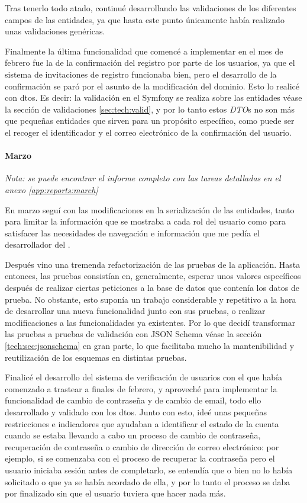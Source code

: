 Tras tenerlo todo atado, continué desarrollando las validaciones de los diferentes campos
de las entidades, ya que hasta este punto únicamente había realizado unas validaciones
genéricas.

Finalmente la última funcionalidad que comencé a implementar en el mes de febrero fue la de la
confirmación del registro por parte de los usuarios, ya que el sistema de invitaciones
de registro funcionaba bien, pero el desarrollo de la confirmación se paró por el asunto
de la modificación del dominio. Esto lo realicé con \gls{dto}s.
Es decir: la validación en el  Symfony se realiza
sobre las entidades \textemdash véase la sección de validaciones \ref{sec:tech:valid}\textemdash,
y por lo tanto estos \textit{DTO}s no son más que pequeñas entidades que sirven para un
propósito específico, como puede ser el recoger el identificador y el correo electrónico
de la confirmación del usuario.

\paragraph{Marzo}
\textit{Nota: se puede encontrar el informe completo con las tareas detalladas
en el anexo \ref{app:reports:march}}

En marzo seguí con las modificaciones en la serialización de las entidades, tanto para
limitar la información que se mostraba a cada rol del usuario como para satisfacer las
necesidades de navegación e información que me pedía el desarrollador del .

Después vino una tremenda refactorización de las pruebas de la aplicación. Hasta entonces,
las pruebas consistían en, generalmente, esperar unos valores específicos después de
realizar ciertas peticiones a la base de datos que contenía los datos de prueba. No obstante,
esto suponía un trabajo considerable y repetitivo a la hora de desarrollar una nueva
funcionalidad junto con sus pruebas, o realizar modificaciones a las funcionalidades ya existentes. Por
lo que decidí transformar las pruebas a pruebas de validación con JSON Schema \textemdash véase la sección  \ref{tech:sec:jsonschema} \textemdash
en gran parte, lo que facilitaba mucho la mantenibilidad y reutilización de los esquemas en distintas pruebas.

Finalicé el desarrollo del sistema de verificación de usuarios con el que había comenzado
a trastear a finales de febrero, y aproveché para implementar la funcionalidad de cambio
de contraseña y de cambio de email, todo ello desarrollado y validado con los \gls{dto}s.
Junto con esto, ideé unas pequeñas restricciones
e indicadores que ayudaban a identificar el estado de la cuenta cuando se estaba llevando
a cabo un proceso de cambio de contraseña, recuperación de contraseña o cambio de dirección de correo electrónico: por ejemplo, si se comenzaba
con el proceso de recuperar la contraseña pero el usuario iniciaba sesión antes de completarlo,
se entendía que o bien no lo había solicitado o que ya se había acordado de ella, y por lo tanto
el proceso se daba por finalizado sin que el usuario tuviera que hacer nada más.

